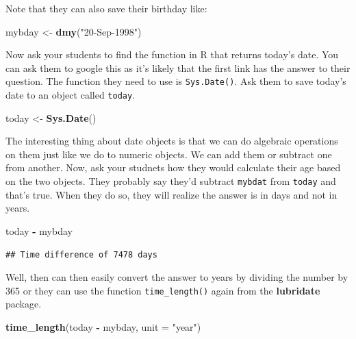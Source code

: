 \documentclass[]{book}
\newenvironment{Shaded}{\begin{snugshade}}{\end{snugshade}}
\newcommand{\DataTypeTok}[1]{\textcolor[rgb]{0.13,0.29,0.53}{#1}}
\newcommand{\KeywordTok}[1]{\textcolor[rgb]{0.13,0.29,0.53}{\textbf{#1}}}
\newcommand{\NormalTok}[1]{#1}
\newcommand{\OperatorTok}[1]{\textcolor[rgb]{0.81,0.36,0.00}{\textbf{#1}}}
\newcommand{\StringTok}[1]{\textcolor[rgb]{0.31,0.60,0.02}{#1}}
\begin{document}
Note that they can also save their birthday like:

\begin{Shaded}
\begin{Highlighting}[]
\NormalTok{mybday <-}\StringTok{ }\KeywordTok{dmy}\NormalTok{(}\StringTok{"20-Sep-1998"}\NormalTok{)}
\end{Highlighting}
\end{Shaded}

Now ask your students to find the function in R that returns today's date. You can ask them to google this as it's likely that the first link has the answer to their question. The function they need to use is \texttt{Sys.Date()}. Ask them to save today's date to an object called \texttt{today}.

\begin{Shaded}
\begin{Highlighting}[]
\NormalTok{today <-}\StringTok{ }\KeywordTok{Sys.Date}\NormalTok{()}
\end{Highlighting}
\end{Shaded}

The interesting thing about date objects is that we can do algebraic operations on them just like we do to numeric objects. We can add them or subtract one from another. Now, ask your studnets how they would calculate their age based on the two objects. They probably say they'd subtract \texttt{mybdat} from \texttt{today} and that's true. When they do so, they will realize the answer is in days and not in years.

\begin{Shaded}
\begin{Highlighting}[]
\NormalTok{today }\OperatorTok{-}\StringTok{ }\NormalTok{mybday}
\end{Highlighting}
\end{Shaded}

\begin{verbatim}
## Time difference of 7478 days
\end{verbatim}

Well, then can then easily convert the answer to years by dividing the number by 365 or they can use the function \texttt{time\_length()} again from the \textbf{lubridate} package.

\begin{Shaded}
\begin{Highlighting}[]
\KeywordTok{time_length}\NormalTok{(today }\OperatorTok{-}\StringTok{ }\NormalTok{mybday, }\DataTypeTok{unit =} \StringTok{"year"}\NormalTok{)}
\end{Highlighting}
\end{Shaded}
\end{document}
